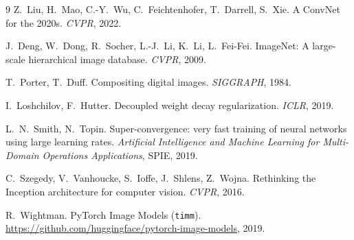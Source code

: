 \documentclass[11pt,a4paper]{article}
\newcommand{\code}[1]{\texttt{\small #1}}
\begin{document}
\begin{thebibliography}{9}\small
{}
Z.~Liu, H.~Mao, C.-Y.~Wu, C.~Feichtenhofer, T.~Darrell, S.~Xie.
\newblock A ConvNet for the 2020s.
\newblock \emph{CVPR}, 2022.

J.~Deng, W.~Dong, R.~Socher, L.-J.~Li, K.~Li, L.~Fei-Fei.
\newblock ImageNet: A large-scale hierarchical image database.
\newblock \emph{CVPR}, 2009.

T.~Porter, T.~Duff.
\newblock Compositing digital images.
\newblock \emph{SIGGRAPH}, 1984.

I.~Loshchilov, F.~Hutter.
\newblock Decoupled weight decay regularization.
\newblock \emph{ICLR}, 2019.

L.~N.~Smith, N.~Topin.
\newblock Super-convergence: very fast training of neural networks using large learning rates.
\newblock \emph{Artificial Intelligence and Machine Learning for Multi-Domain Operations Applications}, SPIE, 2019.

C.~Szegedy, V.~Vanhoucke, S.~Ioffe, J.~Shlens, Z.~Wojna.
\newblock Rethinking the Inception architecture for computer vision.
\newblock \emph{CVPR}, 2016.

R.~Wightman.
\newblock PyTorch Image Models (\code{timm}).
\newblock \url{https://github.com/huggingface/pytorch-image-models}, 2019.
\end{thebibliography}
\end{document}
